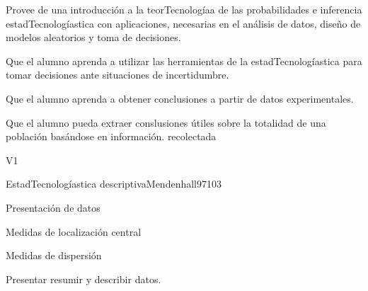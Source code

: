 
\begin{syllabus}


\begin{justification}
Provee de una introducción a la teorTecnologíaa de las probabilidades e inferencia estadTecnologíastica con aplicaciones, necesarias en el análisis de datos, diseño de modelos aleatorios y toma de decisiones.
\end{justification}

\begin{goals}
\item Que el alumno aprenda a utilizar las herramientas de la estadTecnologíastica para tomar decisiones ante situaciones de incertidumbre.
\item Que el alumno aprenda a obtener conclusiones a partir de datos experimentales.
\item Que el alumno pueda extraer conslusiones útiles sobre la totalidad de una población basándose en información. recolectada
\end{goals}

\begin{outcomes}{V1}
   \item {}
   \item {}
   \item {}
\end{outcomes}

\begin{unit}{EstadTecnologíastica descriptiva}{}{Mendenhall97}{10}{3}
\begin{topics}
      \item Presentación de datos
      \item Medidas de localización central
      \item Medidas de dispersión
   \end{topics}

   \begin{learningoutcomes}
      \item Presentar resumir y describir datos.
   \end{learningoutcomes}
\end{unit}


\end{syllabus}
